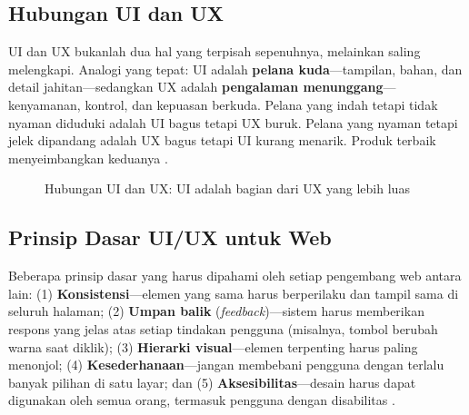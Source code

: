 \subsection{Hubungan UI dan UX}

UI dan UX bukanlah dua hal yang terpisah sepenuhnya, melainkan saling melengkapi. Analogi yang tepat: UI adalah \textbf{pelana kuda}---tampilan, bahan, dan detail jahitan---sedangkan UX adalah \textbf{pengalaman menunggang}---kenyamanan, kontrol, dan kepuasan berkuda. Pelana yang indah tetapi tidak nyaman diduduki adalah UI bagus tetapi UX buruk. Pelana yang nyaman tetapi jelek dipandang adalah UX bagus tetapi UI kurang menarik. Produk terbaik menyeimbangkan keduanya \cite{webdevLearn}.

\begin{figure}[H]
\centering
{}
\caption{Hubungan UI dan UX: UI adalah bagian dari UX yang lebih luas}
\end{figure}

\subsection{Prinsip Dasar UI/UX untuk Web}

Beberapa prinsip dasar yang harus dipahami oleh setiap pengembang web antara lain: (1) \textbf{Konsistensi}---elemen yang sama harus berperilaku dan tampil sama di seluruh halaman; (2) \textbf{Umpan balik} (\textit{feedback})---sistem harus memberikan respons yang jelas atas setiap tindakan pengguna (misalnya, tombol berubah warna saat diklik); (3) \textbf{Hierarki visual}---elemen terpenting harus paling menonjol; (4) \textbf{Kesederhanaan}---jangan membebani pengguna dengan terlalu banyak pilihan di satu layar; dan (5) \textbf{Aksesibilitas}---desain harus dapat digunakan oleh semua orang, termasuk pengguna dengan disabilitas \cite{mdnAccessibility}.

